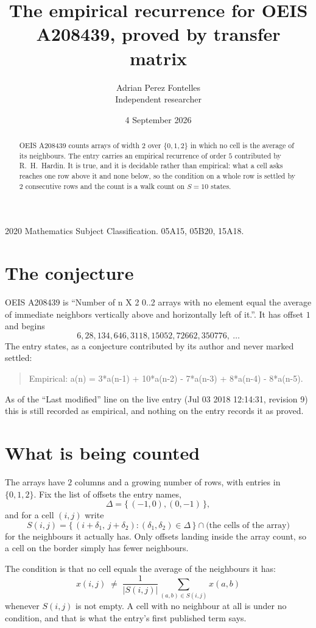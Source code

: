 \documentclass[11pt,a4paper]{article}
\title{The empirical recurrence for OEIS A208439, proved by transfer matrix}
\author{Adrian Perez Fontelles\\ \small Independent researcher}
\date{4 September 2026}
\theoremstyle{plain}
\theoremstyle{definition}
\begin{document}
\maketitle

\begin{abstract}
OEIS A208439 counts arrays of width $2$ over $\{0,1,2\}$ in which no cell is the average of its neighbours. The entry carries an
empirical recurrence of order $5$ contributed by R.~H.~Hardin. It is true, and it is
decidable rather than empirical: what a cell asks reaches one row above
it and none below, so the condition on a whole row is settled by
$2$ consecutive rows and the count is a walk count on $S=10$ states.
\end{abstract}

\noindent\small 2020 Mathematics Subject Classification. 05A15, 05B20, 15A18.\normalsize

\section{The conjecture}

OEIS A208439 is ``Number of n X 2 0..2 arrays with no element equal the average of immediate neighbors vertically above and horizontally left of it.''. It has offset $1$ and begins
\[
6, 28, 134, 646, 3118, 15052, 72662, 350776,\ \dots
\]
The entry states, as a conjecture contributed by its author and never marked settled:
\begin{quote}
Empirical: a(n) = 3*a(n-1) + 10*a(n-2) - 7*a(n-3) + 8*a(n-4) - 8*a(n-5).
\end{quote}
As of the ``Last modified'' line on the live entry (Jul 03 2018 12:14:31, revision 9) this is still
recorded as empirical, and nothing on the entry records it as proved.

\section{What is being counted}

The arrays have $2$ columns and a growing number of rows, with entries in $\{0,1,2\}$. Fix the
list of offsets the entry names,
\[
\Delta=\{\,(-1,0), (0,-1)\,\},
\]
and for a cell $(i,j)$ write
\[
S(i,j)=\{\,(i+\delta_1,\,j+\delta_2) : (\delta_1,\delta_2)\in\Delta\,\}\cap
\text{(the cells of the array)}
\]
for the neighbours it actually has. Only offsets landing inside the array count, so a cell on
the border simply has fewer neighbours.

The condition is that no cell equals the average of the neighbours it has:
\[
x(i,j)\;\neq\;\frac{1}{|S(i,j)|}\sum_{(a,b)\in S(i,j)}x(a,b)
\]
whenever $S(i,j)$ is not empty. A cell with no neighbour at all is under no condition, and that is what the entry's first published term says.
\end{document}
